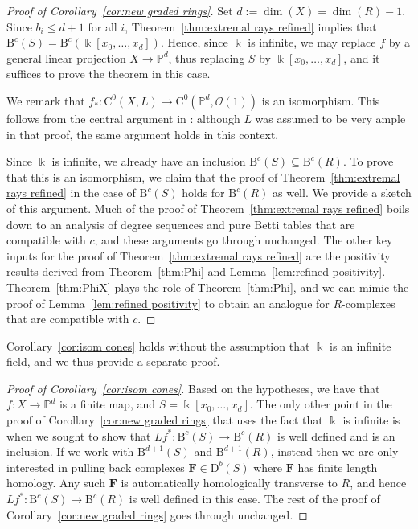 \documentclass[12pt]{amsart}
\theoremstyle{definition}
\theoremstyle{remark}
\newcommand{\kk}{\Bbbk}
\newcommand{\PP}{\mathbb{P}}
\newcommand{\bb}{c}
\newcommand{\cO}{\mathcal{O}}
\newcommand{\cE}{\mathcal{E}}
\newcommand{\cU}{\mathcal{U}}
\newcommand{\FF}{\mathbf{F}}
\newcommand{\DD}{\mathrm{D}}
\newcommand{\CQ}{\mathrm{C}}
\newcommand{\BBQ}{\mathrm{B}}
\begin{document}
\begin{proof}[Proof of Corollary~\ref{cor:new graded rings}]
Set $d:=\dim(X)=\dim(R)-1$.  Since $b_i\leq d+1$ for all $i$, Theorem~\ref{thm:extremal rays refined} implies that $\BBQ^{\bb}(S)=\BBQ^{\bb}(\kk[x_0,\dots,x_d]).$  Hence,  since $\kk$ is infinite, we may replace $f$ by a general linear projection $X\to \PP^d$, thus replacing $S$ by $\kk[x_0,\dots,x_d]$, and it suffices to prove the theorem in this case.

We remark that $f_*\colon \CQ^0(X,L)\to \CQ^{0}(\PP^d, \cO(1))$  is an isomorphism.  This follows from the central argument in
\cite[Proof of Theorem 5]{eis-schrey-abel}: although $L$ was assumed to be very ample in that proof, the same argument
holds in this context.

Since $\kk$ is infinite, we already have an inclusion $\BBQ^{\bb}(S)\subseteq \BBQ^{\bb}(R)$.  To prove that this is an isomorphism, we claim that the proof of Theorem~\ref{thm:extremal rays refined} in the case of $\BBQ^{\bb}(S)$ holds for $\BBQ^{\bb}(R)$ as well.  We provide a sketch of this argument.  Much of the proof of Theorem~\ref{thm:extremal rays refined} boils down to an analysis of degree sequences and pure Betti tables that are compatible with $\bb$, and these arguments go through unchanged.  The other key inputs for the proof of Theorem~\ref{thm:extremal rays refined} are the positivity results derived from Theorem~\ref{thm:Phi} and Lemma~\ref{lem:refined positivity}.  Theorem~\ref{thm:PhiX} plays the role of Theorem~\ref{thm:Phi}, and we can mimic the proof of Lemma~\ref{lem:refined positivity} to obtain an analogue for $R$-complexes that are compatible with $\bb$.  
\end{proof}

Corollary~\ref{cor:isom cones} holds without the assumption that $\kk$ is an infinite field, and we thus provide a separate proof.
\begin{proof}[Proof of Corollary~\ref{cor:isom cones}]
Based on the hypotheses, we have that $f\colon X\to \PP^d$ is a finite map, and $S=\kk[x_0, \dots, x_d]$.  The only other point in the proof of Corollary~\ref{cor:new graded rings} that uses the fact that $\kk$ is infinite is when we sought to show that $Lf^*: \BBQ^{\bb}(S)\to \BBQ^{\bb}(R)$ is well defined and is an inclusion.  If we work with $\BBQ^{d+1}(S)$ and $\BBQ^{d+1}(R)$, instead then we are only interested in pulling back complexes $\FF\in \DD^b(S)$ where $\FF$ has finite length homology.  Any such $\FF$ is automatically homologically transverse to $R$, and hence $Lf^*: \BBQ^{\bb}(S)\to \BBQ^{\bb}(R)$ is well defined in this case.  The rest of the proof of Corollary~\ref{cor:new graded rings} goes through unchanged.
\end{proof}
\end{document}
